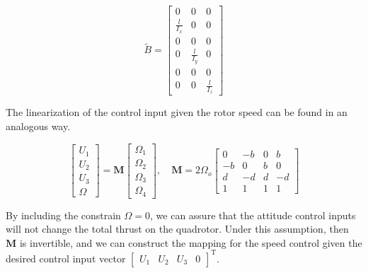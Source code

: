 \documentclass[12pt]{article}
\begin{document}
\begin{equation}
\tilde{B} = 
\begin{bmatrix}
0 & 0 & 0 \\ 
\frac{l}{I_x} & 0 & 0 \\
0 & 0 & 0 \\ 
0 & \frac{l}{I_y} & 0 \\
0 & 0 & 0 \\ 
0 & 0 & \frac{l}{I_z}
\end{bmatrix}
\end{equation}

The linearization of the control input given the rotor speed can be found in an analogous way.

\begin{equation}
  \label{eq:controls}
  \begin{bmatrix}
  U_1 \\ U_2 \\ U_3 \\ \Omega
  \end{bmatrix} = \mathbf{M}
  \begin{bmatrix}
  \Omega_1 \\ \Omega_2 \\ \Omega_3 \\ \Omega_4
  \end{bmatrix},\quad \mathbf{M} = 2\Omega_o
  \begin{bmatrix}
  0 & -b & 0 & b \\ 
  -b & 0 & b & 0 \\ 
  d & -d & d & -d \\
  1 & 1 & 1 & 1
  \end{bmatrix}
\end{equation}

By including the constrain $ \Omega = 0 $, we can assure that the attitude control inputs will not change the total thrust on the quadrotor. Under this assumption, then $ \mathbf{M} $ is invertible, and we can construct the mapping for the speed control given the desired control input vector $ \begin{bmatrix} U_1  & U_2 & U_3 & 0\end{bmatrix}^\mathrm{T} $.
\end{document}

